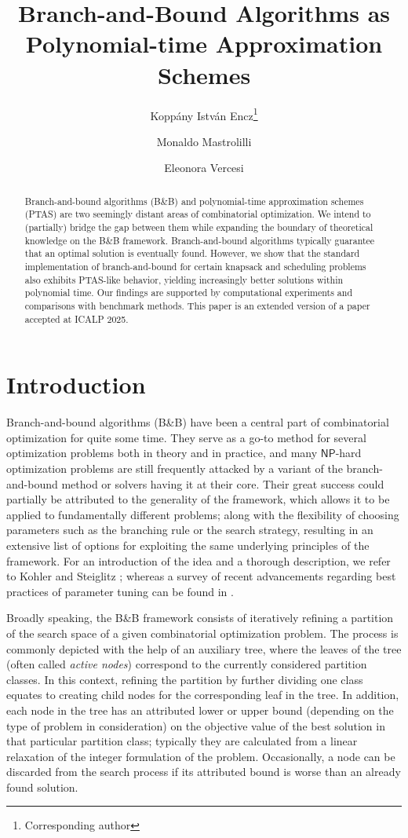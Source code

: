 \documentclass[a4paper,UKenglish,cleveref, autoref, thm-restate, pdfa]{lipics-v2021}
\title{Branch-and-Bound Algorithms as Polynomial-time Approximation Schemes}
\author{{Koppány István} Encz\footnote{Corresponding author}}{Faculty of Informatics, Università della Svizzera italiana, [CH 6962 Lugano, Switzerland] \and Istituto Dalle Molle di studi sull'intelligenza artificiale (IDSIA USI-SUPSI), [CH 6962 Lugano, Switzerland]}{enczk@usi.ch}{}{Supported by the Swiss National Science Foundation project n. $200021\_212929$ / 1 "Computational methods for integrality gaps analysis". Project code: 36RAGAP}
\author{Monaldo Mastrolilli}{Dipartimento Tecnologie innovative, Scuola universitaria professionale della Svizzera italiana [CH 6962 Lugano, Switzerland] \and Istituto Dalle Molle di studi sull'intelligenza artificiale (IDSIA USI-SUPSI) [CH 6962 Lugano, Switzerland]}{monaldo.mastrolilli@supsi.ch}{}{Supported by the Swiss National Science Foundation project n. $200021\_212929$ / 1 "Computational methods for integrality gaps analysis". Project code: 36RAGAP}
\author{Eleonora Vercesi}{Faculty of Informatics, Università della Svizzera italiana, [CH 6962 Lugano, Switzerland] \and Istituto Dalle Molle di studi sull'intelligenza artificiale (IDSIA USI-SUPSI), [CH 6962 Lugano, Switzerland] \and \url{https://eleonoravercesi.github.io/}}{eleonora.vercesi@usi.ch}{}{Supported by the Swiss National Science Foundation project n. $200021\_212929$ / 1 "Computational methods for integrality gaps analysis". Project code: 36RAGAP}
\theoremstyle{plain}
\begin{document}
\maketitle

\begin{abstract}
Branch-and-bound algorithms (B\&B) and polynomial-time approximation schemes (PTAS) are two seemingly distant areas of combinatorial optimization. We intend to (partially) bridge the gap between them while expanding the boundary of theoretical knowledge on the B\&B framework. Branch-and-bound algorithms typically guarantee that an optimal solution is eventually found. However, we show that the standard implementation of branch-and-bound for certain knapsack and scheduling problems also exhibits PTAS-like behavior, yielding increasingly better solutions within polynomial time. Our findings are supported by computational experiments and comparisons with benchmark methods. This paper is an extended version of a paper accepted at ICALP 2025.

\end{abstract}

\section{Introduction}\label{sec:intro}

Branch-and-bound algorithms (B\&B) have been a central part of combinatorial optimization for quite some time. They serve as a go-to method for several optimization problems both in theory and in practice, and many $\mathsf{NP}$-hard optimization problems are still frequently attacked by a variant of the branch-and-bound method or solvers having it at their core. Their great success could partially be attributed to the generality of the framework, which allows it to be applied to fundamentally different problems; along with the flexibility of choosing parameters such as the branching rule or the search strategy, resulting in an extensive list of options for exploiting the same underlying principles of the framework. For an introduction of the idea and a thorough description, we refer to Kohler and Steiglitz \cite{kohler_steiglitz}; whereas a survey of recent advancements regarding best practices of parameter tuning can be found in \cite{bnb_survey}.

Broadly speaking, the B\&B framework consists of iteratively refining a partition of the search space of a given combinatorial optimization problem. The process is commonly depicted with the help of an auxiliary tree, where the leaves of the tree (often called \emph{active nodes}) correspond to the currently considered partition classes. In this context, refining the partition by further dividing one class equates to creating child nodes for the corresponding leaf in the tree. In addition, each node in the tree has an attributed lower or upper bound (depending on the type of problem in consideration) on the objective value of the best solution in that particular partition class; typically they are calculated from a linear relaxation of the integer formulation of the problem. Occasionally, a node can be discarded from the search process if its attributed bound is worse than an already found solution. 
\end{document}
